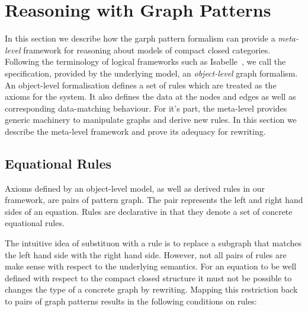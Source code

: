 \documentclass[runningheads]{llncs}
\begin{document}




\section{Reasoning with Graph Patterns}
\label{sec:rewriting}

In this section we describe how the garph pattern formalism can
provide a \emph{meta-level} framework for reasoning about models of
compact closed categories. Following the terminology of logical
frameworks such as Isabelle~\cite{isabelle}, we call the
specification, provided by the underlying model, an
\emph{object-level} graph formalism. An object-level formalisation
defines a set of rules which are treated as the axioms for the
system. It also defines the data at the nodes and edges as well as
corresponding data-matching behaviour. For it's part, the meta-level
provides generic machinery to manipulate graphs and derive new
rules. In this section we describe the meta-level framework and prove
its adequacy for rewriting.

\subsection{Equational Rules}

Axioms defined by an object-level model, as well as derived rules in
our framework, are pairs of pattern graph. The pair represents the
left and right hand sides of an equation. Rules are declarative in
that they denote a set of concrete equational rules. 

The intuitive idea of substituon with a rule is to replace a subgraph
that matches the left hand side with the right hand side. However, not
all pairs of rules are make sense with respect to the underlying
semantics. For an equation to be well defined with respect to the
compact closed structure it must not be possible to changes the type
of a concrete graph by rewriting. Mapping this restriction back to
pairs of graph patterns results in the following conditions on rules:
\end{document}
